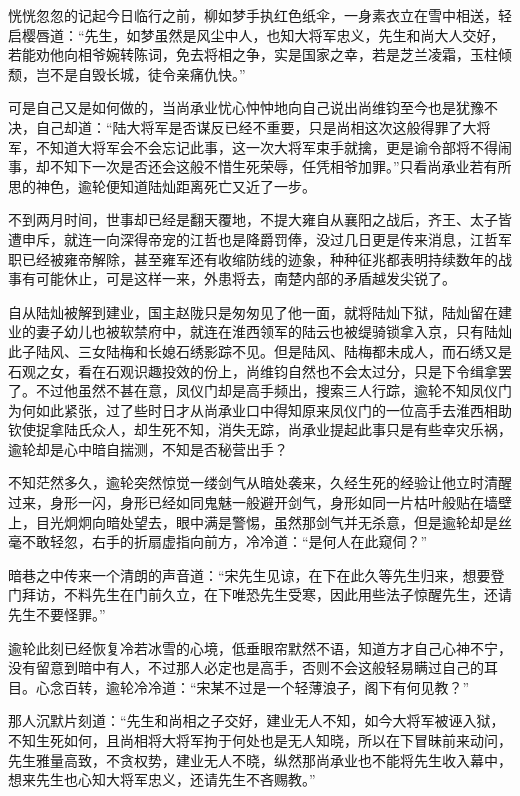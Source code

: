 恍恍忽忽的记起今日临行之前，柳如梦手执红色纸伞，一身素衣立在雪中相送，轻启樱唇道：“先生，如梦虽然是风尘中人，也知大将军忠义，先生和尚大人交好，若能劝他向相爷婉转陈词，免去将相之争，实是国家之幸，若是芝兰凌霜，玉柱倾颓，岂不是自毁长城，徒令亲痛仇快。”

可是自己又是如何做的，当尚承业忧心忡忡地向自己说出尚维钧至今也是犹豫不决，自己却道：“陆大将军是否谋反已经不重要，只是尚相这次这般得罪了大将军，不知道大将军会不会忘记此事，这一次大将军束手就擒，更是谕令部将不得闹事，却不知下一次是否还会这般不惜生死荣辱，任凭相爷加罪。”只看尚承业若有所思的神色，逾轮便知道陆灿距离死亡又近了一步。

不到两月时间，世事却已经是翻天覆地，不提大雍自从襄阳之战后，齐王、太子皆遭申斥，就连一向深得帝宠的江哲也是降爵罚俸，没过几日更是传来消息，江哲军职已经被雍帝解除，甚至雍军还有收缩防线的迹象，种种征兆都表明持续数年的战事有可能休止，可是这样一来，外患将去，南楚内部的矛盾越发尖锐了。

自从陆灿被解到建业，国主赵陇只是匆匆见了他一面，就将陆灿下狱，陆灿留在建业的妻子幼儿也被软禁府中，就连在淮西领军的陆云也被缇骑锁拿入京，只有陆灿此子陆风、三女陆梅和长媳石绣影踪不见。但是陆风、陆梅都未成人，而石绣又是石观之女，看在石观识趣投效的份上，尚维钧自然也不会太过分，只是下令缉拿罢了。不过他虽然不甚在意，凤仪门却是高手频出，搜索三人行踪，逾轮不知凤仪门为何如此紧张，过了些时日才从尚承业口中得知原来凤仪门的一位高手去淮西相助钦使捉拿陆氏众人，却生死不知，消失无踪，尚承业提起此事只是有些幸灾乐祸，逾轮却是心中暗自揣测，不知是否秘营出手？

不知茫然多久，逾轮突然惊觉一缕剑气从暗处袭来，久经生死的经验让他立时清醒过来，身形一闪，身形已经如同鬼魅一般避开剑气，身形如同一片枯叶般贴在墙壁上，目光炯炯向暗处望去，眼中满是警惕，虽然那剑气并无杀意，但是逾轮却是丝毫不敢轻忽，右手的折扇虚指向前方，冷冷道：“是何人在此窥伺？”

暗巷之中传来一个清朗的声音道：“宋先生见谅，在下在此久等先生归来，想要登门拜访，不料先生在门前久立，在下唯恐先生受寒，因此用些法子惊醒先生，还请先生不要怪罪。”

逾轮此刻已经恢复冷若冰雪的心境，低垂眼帘默然不语，知道方才自己心神不宁，没有留意到暗中有人，不过那人必定也是高手，否则不会这般轻易瞒过自己的耳目。心念百转，逾轮冷冷道：“宋某不过是一个轻薄浪子，阁下有何见教？”

那人沉默片刻道：“先生和尚相之子交好，建业无人不知，如今大将军被诬入狱，不知生死如何，且尚相将大将军拘于何处也是无人知晓，所以在下冒昧前来动问，先生雅量高致，不贪权势，建业无人不晓，纵然那尚承业也不能将先生收入幕中，想来先生也心知大将军忠义，还请先生不吝赐教。”

